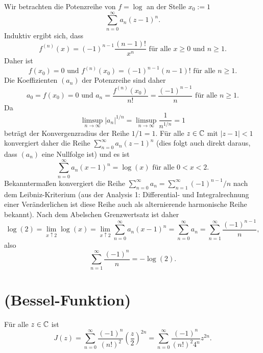 \documentclass[a4paper,10pt]{article}
\begin{document}
Wir betrachten die Potenzreihe von $f = \log$ an der Stelle $x_0 := 1$
\[
  \sum_{n=0}^\infty a_n (z-1)^n.
\]
Induktiv ergibt sich, dass
\[
 f^{(n)}(x) = (-1)^{n-1} \frac{(n-1)!}{x^n} \text{ für alle } x \geq 0 \text{ und } n \geq 1.
\]
Daher ist
\[
 f(x_0) = 0 \text{ und } f^{(n)}(x_0) = (-1)^{n-1}(n-1)! \text{ für alle } n \geq 1.
\]
Die Koeffizienten $(a_n)$ der Potenzreihe sind daher
\[
 a_0 = f(x_0) = 0 \text{ und } a_n = \frac{f^{(n)}(x_0)}{n!} = \frac{(-1)^{n-1}}{n} \text{ für alle } n \geq 1.
\]
Da
\[
 \limsup_{n \to \infty} |a_n|^{1/n} = \limsup_{n \to \infty} \frac{1}{n^{1/n}} = 1
\]
beträgt der Konvergenzradius der Reihe $1/1 = 1$. Für alle $z \in \mathbb{C}$ mit $|z-1| < 1$ konvergiert daher die Reihe $\sum_{n=0}^\infty a_n (z-1)^n$ (dies folgt auch direkt daraus, dass $(a_n)$ eine Nullfolge ist) und es ist
\[
 \sum_{n=0}^\infty a_n (x-1)^n = \log(x) \text{ für alle } 0 < x < 2.
\]
Bekanntermaßen konvergiert die Reihe $\sum_{n=0}^\infty a_n = \sum_{n=1}^\infty (-1)^{n-1}/n$ nach dem Leibniz-Kriterium (aus der Analysis 1: Differential- und Integralrechnung einer Veränderlichen ist diese Reihe auch als alternierende harmonische Reihe bekannt). Nach dem Abelschen Grenzwertsatz ist daher
\[
 \log(2)
 = \lim_{x \uparrow 2} \log(x)
 = \lim_{x \uparrow 2} \sum_{n=0}^\infty a_n (x-1)^n
 = \sum_{n=0}^\infty a_n
 = \sum_{n=1}^\infty \frac{(-1)^{n-1}}{n},
\]
also
\[
 \sum_{n=1}^\infty \frac{(-1)^n}{n} = -\log(2).
\]





\section{(Bessel-Funktion)}
Für alle $z \in \mathbb{C}$ ist
\[
 J(z)
 = \sum_{n=0}^\infty \frac{(-1)^n}{(n!)^2} \left( \frac{z}{2} \right)^{2n}
 = \sum_{n=0}^\infty \frac{(-1)^n}{(n!)^2 4^n} z^{2n}.
\]
\end{document}
